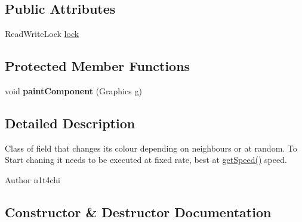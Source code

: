 \subsection*{Public Attributes}
\begin{DoxyCompactItemize}
\item 
Read\+Write\+Lock \hyperlink{classsim_1_1_field_a6f067507d7109db5ec9f1bcb967c9a8c}{lock}
\end{DoxyCompactItemize}
\subsection*{Protected Member Functions}
\begin{DoxyCompactItemize}
\item 
void {\bfseries paint\+Component} (Graphics g)\hypertarget{classsim_1_1_field_a3cab9d793a3f7d165b6ce8b78dbf7c9a}{}\label{classsim_1_1_field_a3cab9d793a3f7d165b6ce8b78dbf7c9a}

\end{DoxyCompactItemize}


\subsection{Detailed Description}
Class of field that changes its colour depending on neighbours or at random. To Start chaning it needs to be executed at fixed rate, best at \hyperlink{classsim_1_1_field_aacac61a31d2b8da325e306f4040e7929}{get\+Speed()} speed. \begin{DoxyAuthor}{Author}
n1t4chi 
\end{DoxyAuthor}


\subsection{Constructor \& Destructor Documentation}
